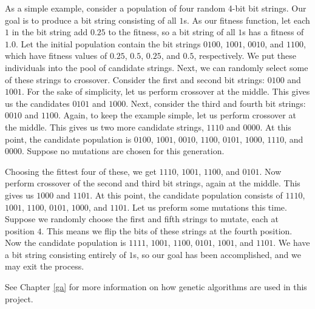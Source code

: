 As a simple example, consider a population of four random 4-bit bit strings.
Our goal is to produce a bit string consisting of all $1$s.
As our fitness function, let each $1$ in the bit string add $0.25$ to the fitness, so a bit string of all $1$s has a fitness of $1.0$.
Let the initial population contain the bit strings $0100$, $1001$, $0010$, and $1100$, which have fitness values of $0.25$, $0.5$, $0.25$, and $0.5$, respectively.
We put these individuals into the pool of candidate strings.
Next, we can randomly select some of these strings to crossover.
Consider the first and second bit strings: $0100$ and $1001$.
For the sake of simplicity, let us perform crossover at the middle.
This gives us the candidates $0101$ and $1000$.
Next, consider the third and fourth bit strings: $0010$ and $1100$.
Again, to keep the example simple, let us perform crossover at the middle.
This gives us two more candidate strings, $1110$ and $0000$.
At this point, the candidate population is $0100$, $1001$, $0010$, $1100$, $0101$, $1000$, $1110$, and $0000$.
Suppose no mutations are chosen for this generation.

Choosing the fittest four of these, we get $1110$, $1001$, $1100$, and $0101$.
Now perform crossover of the second and third bit strings, again at the middle.
This gives us $1000$ and $1101$.
At this point, the candidate population consists of $1110$, $1001$, $1100$, $0101$, $1000$, and $1101$.
Let us preform some mutations this time.
Suppose we randomly choose the first and fifth strings to mutate, each at position $4$.
This means we flip the bits of these strings at the fourth position.
Now the candidate population is $1111$, $1001$, $1100$, $0101$, $1001$, and $1101$.
We have a bit string consisting entirely of $1$s, so our goal has been accomplished, and we may exit the process.

See Chapter \ref{ga} for more information on how genetic algorithms are used in this project.
